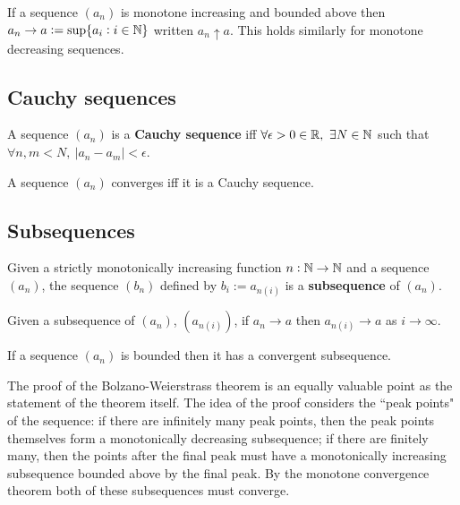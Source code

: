 \documentclass{article}
\begin{document}
\begin{theorem}
    If a sequence $(a_n)$ is monotone increasing and bounded above then $a_n\rightarrow a := \sup\{a_i:i\in\mathbb{N}\}$ written $a_n\uparrow a$. This holds similarly for monotone decreasing sequences.
\end{theorem}

\subsection{Cauchy sequences}

\begin{definition}
   A sequence $(a_n)$ is a \textbf{Cauchy sequence} iff $\forall \epsilon>0\in\mathbb{R}, \ \exists N\in\mathbb{N}$ such that $\forall n,m<N, \ |a_n-a_m|<\epsilon$.
\end{definition}

\begin{theorem}
    A sequence $(a_n)$ converges iff it is a Cauchy sequence.
\end{theorem}

\subsection{Subsequences}

\begin{definition}[Subsequence]
    Given a strictly monotonically increasing function $n:\mathbb{N}\rightarrow\mathbb{N}$ and a sequence $(a_n)$, the  sequence $(b_n)$ defined by $b_i:=a_{n(i)}$ is a \textbf{subsequence} of $(a_n)$.
\end{definition}

\begin{theorem}
    Given a subsequence of $(a_n)$, $(a_{n(i)})$, if $a_n\rightarrow a$ then $a_{n(i)}\rightarrow a$ as $i\rightarrow\infty$.
\end{theorem}

\begin{theorem}
    If a sequence $(a_n)$ is bounded then it has a convergent subsequence.
\end{theorem}

\begin{note}
    The proof of the Bolzano-Weierstrass theorem is an equally valuable point as the statement of the theorem itself. The idea of the proof considers the ``peak points" of the sequence: if there are infinitely many peak points, then the peak points themselves form a monotonically decreasing subsequence; if there are finitely many, then the points after the final peak must have a monotonically increasing subsequence bounded above by the final peak. By the monotone convergence theorem both of these subsequences must converge.
\end{note}
\end{document}
